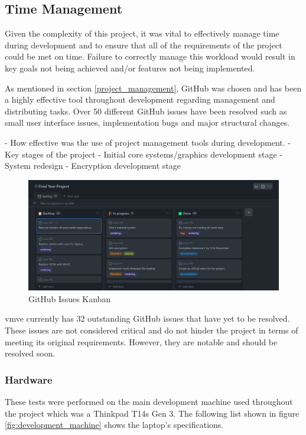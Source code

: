 \documentclass[11pt]{article}
\begin{document}
\subsection{Time Management}
Given the complexity of this project, it was vital to effectively manage time
during development and to ensure that all of the requirements of the project
could be met on time. Failure to correctly manage this workload would result in
key goals not being achieved and/or features not being implemented.

As mentioned in section \ref{project_management}, GitHub was chosen and has been
a highly effective tool throughout development regarding management and
distributing tasks. Over 50 different GitHub issues have been resolved such as
small user interface issues, implementation bugs and major structural changes.

- How effective was the use of project management tools
during development.
- Key stages of the project
    - Initial core systems/graphics development stage
    - System redesign
    - Encryption development stage

\begin{figure}[H]
  \centering
  \includegraphics[width=\textwidth]{images/github_project.png}
  \caption{GitHub Issues Kanban}
  \label{fig:github_kanban}
\end{figure}
    
\gls*{vmve} currently has 32 outstanding GitHub issues that have yet to be
resolved. These issues are not considered critical and do not hinder the project
in terms of meeting its original requirements. However, they are notable and
should be resolved soon.

\subsubsection{Hardware}
These tests were performed on the main development machine used throughout the
project which was a Thinkpad T14s Gen 3. The following list shown in figure
\ref{fig:development_machine} shows the laptop's specifications.
\end{document}
